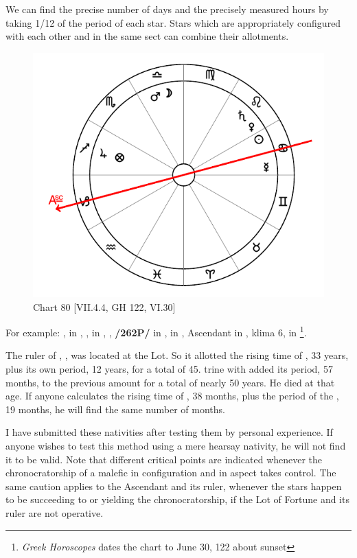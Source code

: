 We can find the precise number of days and the precisely measured hours by taking 1/12 of the period of each star. Stars which are appropriately configured with each other and in the same sect can combine their allotments. 

\newpage
\begin{figure}
\centering
\vspace{-10pt}
\includegraphics[width=.68\textwidth]{charts/7_4_4}
\caption{Chart 80 [VII.4.4, GH 122, VI.30]}
\label{fig:chart80}
\end{figure} 

For example: \Sun, \Mercury\xspace in \Cancer, \Moon, \Mars\xspace in \Libra, \Saturn, \Venus\xspace \textbf{/262P/} in \Leo, \Jupiter\xspace in \Sagittarius, Ascendant in \Capricorn, klima 6, \Fortune\xspace in \Sagittarius\footnote{\textit{Greek Horoscopes} dates the chart to June 30, 122 about sunset}. 

The ruler of \Sagittarius, \Jupiter, was located at the Lot. So it allotted the rising time of \Sagittarius, 33 years, plus its own period, 12 years, for a total of 45. \Saturn\xspace trine with \Jupiter\xspace added its period, 57 months, to the previous amount for a total of nearly 50 years. He died at that age. If anyone calculates the rising time of \Leo, 38 months, plus the period of the \Sun, 19 months, he will find the same number of months.

I have submitted these nativities after testing them by personal experience. If anyone wishes to test this method using a mere hearsay nativity, he will not find it to be valid. Note that different critical points
are indicated whenever the chronocratorship of a malefic in configuration and in aspect takes control. The same caution applies to the Ascendant and its ruler, whenever the stars happen to be succeeding to or yielding the chronocratorship, if the Lot of Fortune and its ruler are not operative.

\newpage